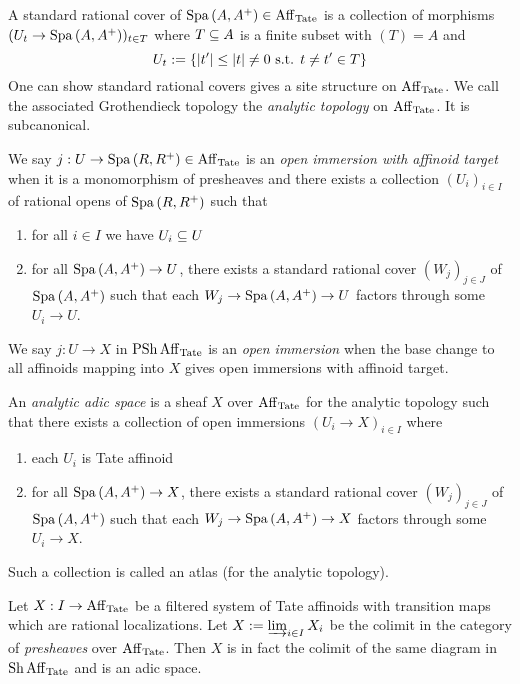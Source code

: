 \documentclass{article}
\begin{document}
\begin{dfn}
  
  A standard rational cover of $\mathrm{Spa}\,(A , A^+) \in \mathrm{Aff}_{\mathrm{Tate}}$ is
  a collection of morphisms $(U_t \to \mathrm{Spa}\,(A , A^+))_{t \in T}$
  where $T \subseteq A$ is a finite subset with $(T) = A$ and 
  \[
    U_t := \left\{\left\vert t^\prime \right\vert \leq \left\vert t \right\vert \neq 0 \text{ s.t. } t \neq t^\prime \in T\right\}
  \]
  \cite[Def. IV.2.3.1]{Mor19}
  One can show standard rational covers
  gives a site structure on $\mathrm{Aff}_{\mathrm{Tate}}$.
  We call the associated Grothendieck topology
  the \emph{analytic topology} on $\mathrm{Aff}_{\mathrm{Tate}}$.
  It is subcanonical.
\end{dfn}

\begin{dfn}

  We say $j : U \to \mathrm{Spa}\,(R , R^+) \in \mathrm{Aff}_{\mathrm{Tate}}$ 
  is an \emph{open immersion with affinoid target} when
  it is a monomorphism of presheaves
  and there exists a collection $(U_i)_{i\in I}$ of rational opens
  of $\mathrm{Spa}\,(R , R^+)$ such that 
  \begin{enumerate}
    \item for all $i\in I$ we have $U_i \subseteq U$
    \item for all $\mathrm{Spa}\, (A , A^+) \to U$,
    there exists a standard rational cover $(W_j)_{j \in J}$ 
    of $\mathrm{Spa}\,(A , A^+)$ such that each $W_j \to \mathrm{Spa}\,(A , A^+) \to U$ 
    factors through some $U_i \to U$.
  \end{enumerate}

  We say $j : U \to X$ in $\operatorname{PSh} \mathrm{Aff}_{\mathrm{Tate}}$ is an \emph{open immersion}
  when the base change to all affinoids mapping into $X$ gives
  open immersions with affinoid target.

  An \emph{analytic adic space} 
  is a sheaf $X$ over $\mathrm{Aff}_{\mathrm{Tate}}$ for the analytic topology
  such that there exists a collection of open immersions $(U_i \to X)_{i \in I}$
  where \begin{enumerate}
    \item each $U_i$ is Tate affinoid
    \item for all $\mathrm{Spa}\,(A , A^+) \to X$,
    there exists a standard rational cover $(W_j)_{j \in J}$ of $\mathrm{Spa}\,(A , A^+)$
    such that each $W_j \to \mathrm{Spa}\,(A , A^+) \to X$ factors through some
    $U_i \to X$.
  \end{enumerate}
  Such a collection is called an atlas (for the analytic topology).
\end{dfn}
\begin{prop}
  
  Let $X : I \to \mathrm{Aff}_{\mathrm{Tate}}$ be a filtered system of Tate affinoids
  with transition maps which are rational localizations.
  Let $X := \varinjlim_{i \in I} X_i$ be the colimit
  in the category of \emph{presheaves} over $\mathrm{Aff}_{\mathrm{Tate}}$.
  Then $X$ is in fact the colimit of the same diagram
  in $\operatorname{Sh} \mathrm{Aff}_{\mathrm{Tate}}$ and is an adic space.
\end{prop}
\end{document}
